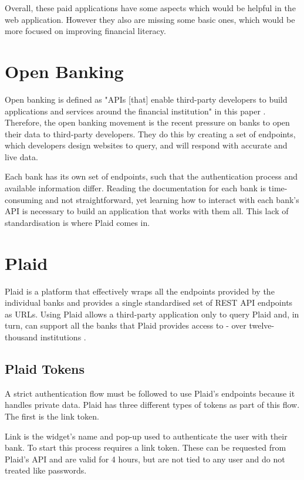 Overall, these paid applications have some aspects which would be helpful in the web application. However they also are missing some basic ones, which would be more focused on improving financial literacy.

\section{Open Banking}
\label{sec:open-banking}
Open banking is defined as "APIs [that] enable third-party developers to build applications and services around the financial institution" in this paper \cite{OpenBankingDefinition}. Therefore, the open banking movement is the recent pressure on banks to open their data to third-party developers. They do this by creating a set of endpoints, which developers design websites to query, and will respond with accurate and live data.

Each bank has its own set of endpoints, such that the authentication process and available information differ. Reading the documentation for each bank is time-consuming and not straightforward, yet learning how to interact with each bank's API is necessary to build an application that works with them all. This lack of standardisation is where Plaid \cite{Plaid} comes in.

\section{Plaid}
\label{sec:plaid}
Plaid is a platform that effectively wraps all the endpoints provided by the individual banks and provides a single standardised set of REST API endpoints as URLs. Using Plaid allows a third-party application only to query Plaid and, in turn, can support all the banks that Plaid provides access to - over twelve-thousand institutions \cite{PlaidInstitutions}.

\subsection{Plaid Tokens}
A strict authentication flow must be followed to use Plaid's endpoints because it handles private data. Plaid has three different types of tokens as part of this flow. The first is the link token.

Link is the widget's name and pop-up used to authenticate the user with their bank. To start this process requires a link token. These can be requested from Plaid's API and are valid for 4 hours, but are not tied to any user and do not treated like passwords.

